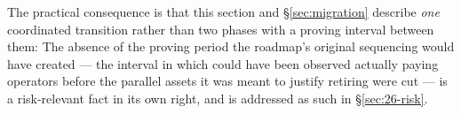 The practical consequence is that this section and \S\ref{sec:migration} describe \emph{one}
coordinated transition rather than two phases with a proving interval between them:  The absence of the proving period the
roadmap's original sequencing would have created — the interval in which \PNR could have been
observed actually paying operators before the parallel assets it was meant to justify retiring were
cut — is a risk-relevant fact in its own right, and is addressed as such in \S\ref{sec:26-risk}.

\FloatBarrier
